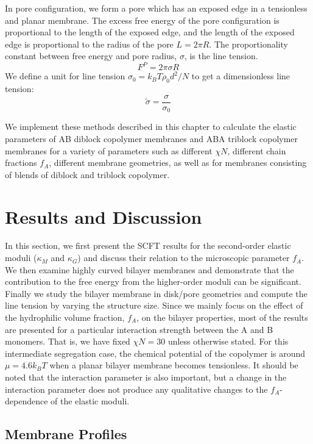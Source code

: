 \documentclass[twocolumn,aps,floatfix,nobibnotes]{revtex4-1}
\begin{document}
In pore configuration, we form a pore which has an exposed edge in a tensionless and planar membrane. The excess free energy of the pore configuration is proportional to the length of the exposed edge, and the length of the exposed edge is proportional to the radius of the pore $L = 2 \pi R$. The proportionality constant between free energy and pore radius, $\sigma$, is the line tension.
\begin{equation}
F^P = 2 \pi \sigma R
\end{equation}
We define a unit for line tension $\sigma_0 = k_B T \rho_0 d^2 /N$ to get a dimensionless line tension:
\begin{equation}
\tilde{\sigma} = \frac{\sigma}{\sigma_0}
\end{equation}

We implement these methods described in this chapter to calculate the elastic parameters of AB diblock copolymer membranes and ABA triblock copolymer membranes for a variety of parameters such as different $\chi N$, different chain fractions $f_A$, different membrane geometries, as well as for membranes consisting of blends of diblock and triblock copolymer.

\section{Results and Discussion}
\label{sec:results}

In this section, we first present the SCFT results for the second-order elastic moduli ($\kappa_M$ and $\kappa_G$) and discuss their relation to the microscopic parameter $f_A$.
We then examine highly curved bilayer membranes and demonstrate that the contribution to the free energy from the higher-order moduli can be significant.
Finally we study the bilayer membrane in disk/pore geometries and compute the line tension by varying the structure size.
Since we mainly focus on the effect of the hydrophilic volume fraction, $f_A$, on the bilayer properties, most of the results are presented for a particular interaction strength between the A and B monomers.
That is, we have fixed $\chi N=30$ unless otherwise stated.
For this intermediate segregation case, the chemical potential of the copolymer is around $\mu=4.6k_BT$ when a planar bilayer membrane becomes tensionless.
It should be noted that the interaction parameter is also important, but a change in the interaction parameter does not produce any qualitative changes to
the $f_{A}$-dependence of the elastic moduli.

\subsection{Membrane Profiles}
\end{document}
